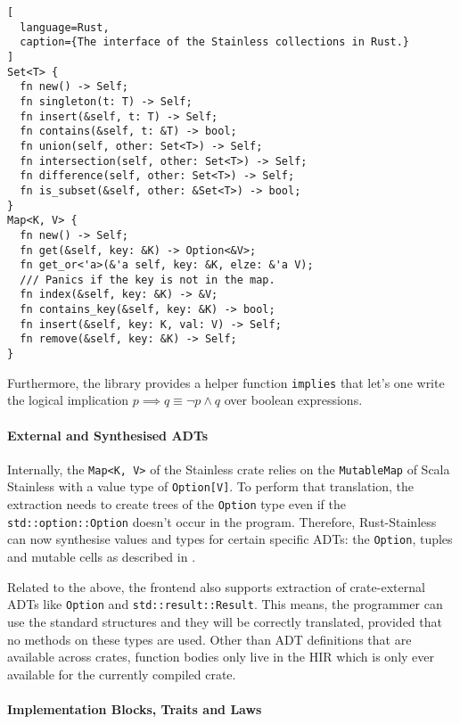 \begin{lstlisting}[
  language=Rust,
  caption={The interface of the Stainless collections in Rust.}
]
Set<T> {
  fn new() -> Self;
  fn singleton(t: T) -> Self;
  fn insert(&self, t: T) -> Self;
  fn contains(&self, t: &T) -> bool;
  fn union(self, other: Set<T>) -> Self;
  fn intersection(self, other: Set<T>) -> Self;
  fn difference(self, other: Set<T>) -> Self;
  fn is_subset(&self, other: &Set<T>) -> bool;
}
Map<K, V> {
  fn new() -> Self;
  fn get(&self, key: &K) -> Option<&V>;
  fn get_or<'a>(&'a self, key: &K, elze: &'a V);
  /// Panics if the key is not in the map.
  fn index(&self, key: &K) -> &V;
  fn contains_key(&self, key: &K) -> bool;
  fn insert(&self, key: K, val: V) -> Self;
  fn remove(&self, key: &K) -> Self;
}
\end{lstlisting}

Furthermore, the library provides a helper function
\passthrough{\lstinline!implies!} that let's one write the logical
implication $p \implies q \equiv \neg{p} \land q$ over boolean expressions.


\paragraph{External and Synthesised ADTs}

Internally, the \lstinline!Map<K, V>! of the Stainless crate relies on
the \passthrough{\lstinline!MutableMap!} of Scala Stainless with a value
type of \passthrough{\lstinline!Option[V]!}. To perform that
translation, the extraction needs to create trees of the
\passthrough{\lstinline!Option!} type even if the
\passthrough{\lstinline!std::option::Option!} doesn't occur in the
program. Therefore, Rust-Stainless can now synthesise values and types
for certain specific ADTs: the \passthrough{\lstinline!Option!}, tuples
and mutable cells as described in .

Related to the above, the frontend also supports extraction of
crate-external ADTs like \passthrough{\lstinline!Option!} and
\passthrough{\lstinline!std::result::Result!}. This means, the
programmer can use the standard structures and they will be correctly
translated, provided that no methods on these types are used. Other than
ADT definitions that are available across crates, function bodies only
live in the HIR which is only ever available for the currently compiled
crate.

\paragraph{Implementation Blocks, Traits and Laws}

